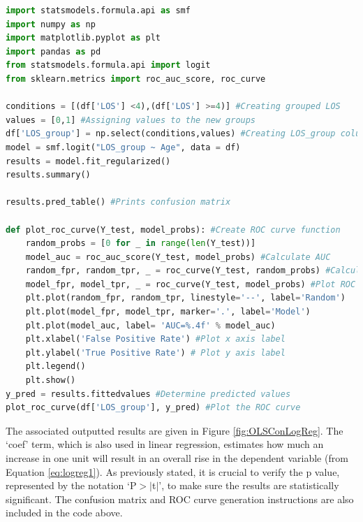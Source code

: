 \documentclass[../thesis.tex]{subfiles}
\begin{document}
\begin{lstlisting}[language = python]
import statsmodels.formula.api as smf
import numpy as np
import matplotlib.pyplot as plt
import pandas as pd
from statsmodels.formula.api import logit
from sklearn.metrics import roc_auc_score, roc_curve

conditions = [(df['LOS'] <4),(df['LOS'] >=4)] #Creating grouped LOS
values = [0,1] #Assigning values to the new groups 
df['LOS_group'] = np.select(conditions,values) #Creating LOS_group column
model = smf.logit("LOS_group ~ Age", data = df)
results = model.fit_regularized()
results.summary()

results.pred_table() #Prints confusion matrix

def plot_roc_curve(Y_test, model_probs): #Create ROC curve function
    random_probs = [0 for _ in range(len(Y_test))] 
    model_auc = roc_auc_score(Y_test, model_probs) #Calculate AUC
    random_fpr, random_tpr, _ = roc_curve(Y_test, random_probs) #Calculate ROC Curve for Random Model
    model_fpr, model_tpr, _ = roc_curve(Y_test, model_probs) #Plot ROC curves
    plt.plot(random_fpr, random_tpr, linestyle='--', label='Random')
    plt.plot(model_fpr, model_tpr, marker='.', label='Model')
    plt.plot(model_auc, label= 'AUC=%.4f' % model_auc) 
    plt.xlabel('False Positive Rate') #Plot x axis label 
    plt.ylabel('True Positive Rate') # Plot y axis label
    plt.legend()
    plt.show()
y_pred = results.fittedvalues #Determine predicted values
plot_roc_curve(df['LOS_group'], y_pred) #Plot the ROC curve
\end{lstlisting}


The associated outputted results are given in Figure \ref{fig:OLSConLogReg}. The `coef' term, which is also used in linear regression, estimates how much an increase in one unit will result in an overall rise in the dependent variable (from Equation \eqref{eq:logreg1}). As previously stated, it is crucial to verify the p value, represented by the notation `P$> |$t$|$', to make sure the results are statistically significant. The confusion matrix and ROC curve generation instructions are also included in the code above.
\end{document}
